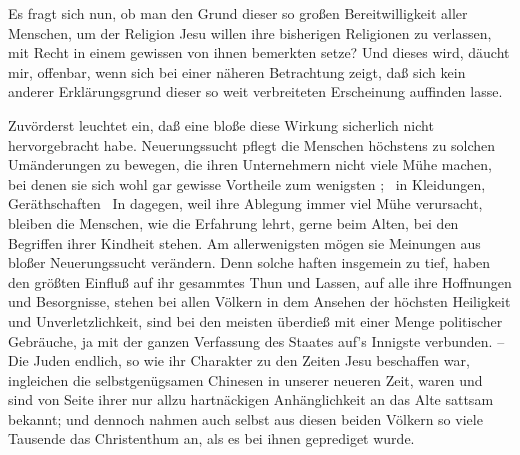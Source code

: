 Es fragt sich nun, ob man den Grund dieser so großen Bereitwilligkeit aller Menschen, um der Religion Jesu willen ihre bisherigen Religionen zu verlassen, mit Recht in einem gewissen von ihnen bemerkten  setze? Und dieses wird, däucht mir, offenbar, wenn sich bei einer näheren Betrachtung zeigt, daß sich kein anderer Erklärungsgrund dieser so weit verbreiteten Erscheinung auffinden lasse.
\begin{aufza}
\item Zuvörderst leuchtet ein, daß eine bloße  diese Wirkung sicherlich nicht hervorgebracht habe. Neuerungssucht pflegt die Menschen höchstens zu solchen Umänderungen zu bewegen, die ihren Unternehmern nicht viele Mühe machen, bei denen sie sich wohl gar gewisse Vortheile zum wenigsten ; \zB\ in Kleidungen, Geräthschaften \udgl\  In  dagegen, weil ihre Ablegung immer viel Mühe verursacht, bleiben die Menschen, wie die Erfahrung lehrt, gerne beim Alten, bei den Begriffen ihrer Kindheit stehen. Am allerwenigsten mögen sie  Meinungen aus bloßer Neuerungssucht verändern. Denn solche haften insgemein zu tief, haben den größten Einfluß auf ihr gesammtes Thun und Lassen, auf alle ihre Hoffnungen und Besorgnisse, stehen bei allen Völkern in dem Ansehen der höchsten Heiligkeit und Unverletzlichkeit, sind bei den meisten überdieß mit einer Menge politischer Gebräuche, ja mit der ganzen Verfassung des Staates auf's Innigste verbunden. -- Die Juden endlich, so wie ihr Charakter zu den Zeiten Jesu beschaffen war, ingleichen die selbstgenügsamen Chinesen in unserer neueren Zeit, waren und sind von Seite ihrer nur allzu hartnäckigen Anhänglichkeit an das Alte sattsam bekannt; und dennoch nahmen auch selbst aus diesen beiden Völkern so viele Tausende das Christenthum an, als es bei ihnen geprediget wurde.

\end{aufza}
